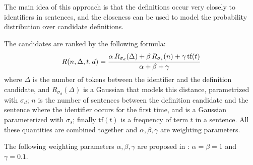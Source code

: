 The main idea of this approach is that the definitions occur very closely
to identifiers in sentences, and the closeness can be used to
model the probability distribution over candidate definitions.

The candidates are ranked by the following formula:
$$R(n, \Delta, t, d) = \cfrac{\alpha \, R_{\sigma_d}(\Delta) + \beta \, R_{\sigma_s}(n) + \gamma \, \text{tf}(t)}{\alpha + \beta + \gamma}$$
where $\Delta$ is the number of tokens between the identifier and the definition
candidate, and $R_{\sigma_d}(\Delta)$ is a Gaussian that models this distance, parametrized
with $\sigma_d$; $n$ is the number of sentences between the definition candidate 
and the sentence where the identifier occurs for the first time, and is a Gaussian
parameterized with $\sigma_s$; finally $\text{tf}(t)$ is a frequency of term $t$ 
in a sentence. All these quantities are combined together and $\alpha, \beta, \gamma$ are weighting parameters. 

The following weighting parameters $\alpha, \beta, \gamma$ are proposed in 
\cite{pagael2014mlp}: $\alpha = \beta = 1$ and $\gamma = 0.1$.

